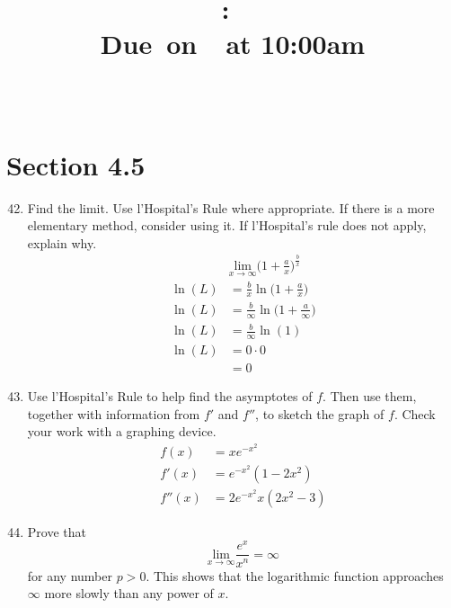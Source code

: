 \documentclass{article}
\title{
    \vspace{2in}
    \textmd{\textbf{\hmwkClass:\ \hmwkTitle}}\\
    \normalsize\vspace{0.1in}\small{Due\ on\ \hmwkDueDate\ at 10:00am}\\
    \vspace{0.1in}\large{\textit{\hmwkClassInstructor\ \hmwkClassTime}}
    \vspace{3in}
}
\author{\hmwkAuthorName}
\date{}
\begin{document}
\maketitle

\pagebreak

\section{Section 4.5}

\begin{enumerate}
\setcounter{enumi}{41}
	\item Find the limit. Use l'Hospital's Rule where appropriate. If there is a more elementary method, consider using it. If l'Hospital's rule does not apply, explain why.
		$$\begin{aligned}
			&\underset{x\rightarrow \infty}{\text{lim}}\Big(1+\frac{a}{x}\Big)^{\frac{b}{x}} \\
			\ln(L)&=\frac{b}{x}\ln\Big(1+\frac{a}{x}\Big)\\
			\ln(L)&=\frac{b}{\infty}\ln\Big(1+\frac{a}{\infty}\Big)\\
			\ln(L)&=\frac{b}{\infty}\ln(1)\\
			\ln(L)&=0 \cdot 0\\
			&= 0
		\end{aligned}$$
\setcounter{enumi}{53}
	\item Use l'Hospital's Rule to help find the asymptotes of $f$. Then use them, together with information from $f'$ and $f''$, to sketch the graph of $f$. Check your work with a graphing device.
		$$\begin{aligned}
f(x)&=xe^{-x^2}\\
f'(x)&=e^{-x^2}(1-2x^2)\\
f''(x)&= 2e^{-x^2}x(2x^2-3)
\end{aligned}$$
\begin{center}
		  		\pgfplotsset{width=\linewidth,height=6cm,xmin=-3,xmax=3,ymin=-0.5,ymax=0.5}
\end{center}
\setcounter{enumi}{63}
	\item Prove that $$\underset{x\rightarrow \infty}{\text{lim}}\frac{e^x}{x^n}=\infty$$ for any number $p>0$. This shows that the logarithmic function approaches $\infty$ more slowly than any power of $x$.

\end{enumerate}
\end{document}

